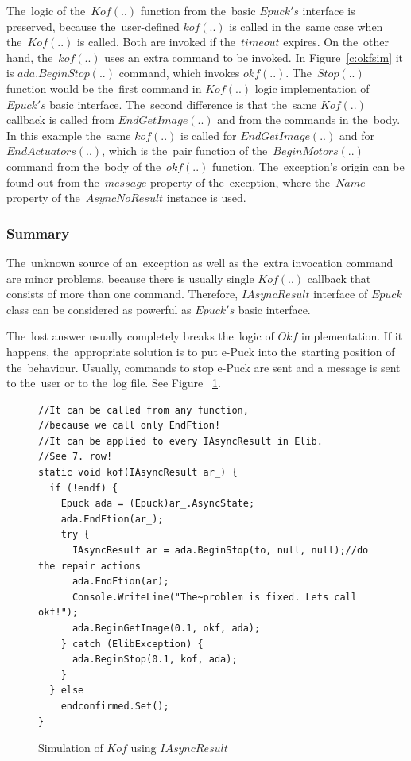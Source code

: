   The~logic of the~$Kof(..)$ function from the~basic $Epuck's$ interface is preserved, because the~user-defined
  $kof(..)$ is called in the~same case when the~$Kof(..)$ is called. Both are invoked if the~$timeout$ expires.
  On the~other hand, the~$kof(..)$ uses an extra command to be invoked. In Figure~\ref{c:okfsim} it
  is $ada.BeginStop(..)$ command, which invokes $okf(..)$. The~$Stop(..)$ function would be the~first command
  in $Kof(..)$ logic implementation of $Epuck's$ basic interface.
  The~second difference is that the~same $Kof(..)$ callback is called from $EndGetImage(..)$ and from the
  commands in the~body. In this example the~same $kof(..)$ is called for $EndGetImage(..)$ and 
  for $EndActuators(..)$, which is the~pair function of the~$BeginMotors(..)$ 
  command from the~body of the~$okf(..)$ function.
  The~exception's origin can be found out from the~$message$ property of the~exception, 
  where the~$Name$ property of the~$AsyncNoResult$ instance is used.

  \subsubsection*{Summary} %
  The~unknown source of an~exception as well as the~extra invocation command are minor problems, because
  there is usually single $Kof(..)$ callback that consists of more than one command. 
  Therefore, $IAsyncResult$ interface of $Epuck$ class can be considered as powerful as $Epuck's$ basic interface.

  \begin{remark} The~lost answer usually completely breaks the~logic of $Okf$
  implementation. If it happens, the~appropriate solution is to put e-Puck into
  the~starting position of the~behaviour. Usually, commands to stop e-Puck are
  sent and a message is sent to the~user or to the~log file. See Figure
 ~\ref{iasynckof}. \end{remark}

\begin{figure}[!hbp]
\begin{lstlisting}
//It can be called from any function,
//because we call only EndFtion!
//It can be applied to every IAsyncResult in Elib.
//See 7. row!
static void kof(IAsyncResult ar_) {
  if (!endf) {
    Epuck ada = (Epuck)ar_.AsyncState;
    ada.EndFtion(ar_);
    try {
      IAsyncResult ar = ada.BeginStop(to, null, null);//do the repair actions
      ada.EndFtion(ar);
      Console.WriteLine("The~problem is fixed. Lets call okf!");
      ada.BeginGetImage(0.1, okf, ada);
    } catch (ElibException) {
      ada.BeginStop(0.1, kof, ada);
    }
  } else
    endconfirmed.Set();
}
\end{lstlisting}
\caption{Simulation of $Kof$ using $IAsyncResult$}
\label{iasynckof}
\end{figure}

